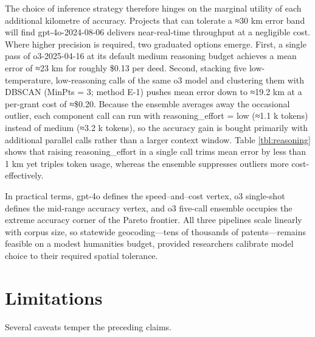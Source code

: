 The choice of inference strategy therefore hinges on the marginal
utility of each additional kilometre of accuracy. Projects that can
tolerate a ≈30 km error band will find gpt-4o-2024-08-06 delivers
near-real-time throughput at a negligible cost. Where higher precision
is required, two graduated options emerge. First, a single pass of
o3-2025-04-16 at its default medium reasoning budget achieves a mean
error of ≈23 km for roughly \$0.13 per deed. Second, stacking five
low-temperature, low-reasoning calls of the same o3 model and clustering
them with DBSCAN (MinPts = 3; method E-1) pushes mean error down to
≈19.2 km at a per-grant cost of ≈\$0.20. Because the ensemble averages
away the occasional outlier, each component call can run with
reasoning\_effort = low (≈1.1 k tokens) instead of medium (≈3.2 k
tokens), so the accuracy gain is bought primarily with additional
parallel calls rather than a larger context window. Table
\ref{tbl:reasoning} shows that raising reasoning\_effort in a single
call trims mean error by less than 1 km yet triples token usage, whereas
the ensemble suppresses outliers more cost-effectively.

In practical terms, gpt-4o defines the speed--and--cost vertex, o3
single-shot defines the mid-range accuracy vertex, and o3 five-call
ensemble occupies the extreme accuracy corner of the Pareto frontier.
All three pipelines scale linearly with corpus size, so statewide
geocoding---tens of thousands of patents---remains feasible on a modest
humanities budget, provided researchers calibrate model choice to their
required spatial tolerance.

\section{Limitations}\label{limitations}

Several caveats temper the preceding claims.

